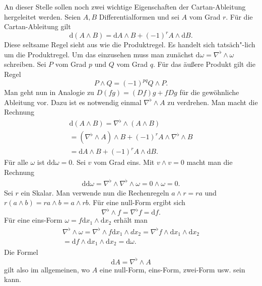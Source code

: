 \documentclass[a4paper,10pt,fleqn,twocolumn,twoside]{article}
\numberwithin{equation}{section}
\begin{document}
An dieser Stelle sollen noch zwei wichtige Eigenschaften der
Cartan-Ableitung hergeleitet werden. Seien $A,B$ Differentialformen
und sei $A$ vom Grad $r$. Für die Cartan-Ableitung gilt
\begin{equation}
\mathrm d(A\wedge B)
= \mathrm dA\wedge B + (-1)^r A\wedge \mathrm dB.
\end{equation}
Diese seltsame Regel sieht aus wie die Produktregel. Es handelt
sich tatsäch"-lich um die Produktregel. Um das einzusehen muss man
zunächst $\mathrm d\omega = \nabla^\flat\wedge\omega$ schreiben.
Sei $P$ vom Grad $p$ und $Q$ vom Grad $q$. Für das
äußere Produkt gilt die Regel
\begin{equation}
P\wedge Q = (-1)^{pq}Q\wedge P.
\end{equation}
Man geht nun in Analogie zu $D(fg)=(Df)g+fDg$ für die gewöhnliche
Ableitung vor. Dazu ist es notwendig einmal $\nabla^\flat\wedge A$
zu verdrehen. Man macht die Rechnung
\begin{gather*}
\mathrm d(A\wedge B) = \nabla^\flat\wedge (A\wedge B)\\
= (\nabla^\flat\wedge A)\wedge B
+ (-1)^r A\wedge\nabla^\flat\wedge B\\
= \mathrm dA\wedge B + (-1)^r A\wedge \mathrm dB.
\end{gather*}
Für alle $\omega$ ist $\mathrm {dd}\omega=0$.
Sei $v$ vom Grad eins.
Mit $v\wedge v=0$ macht man die Rechnung
\begin{gather*}
\mathrm{dd}\omega
= \nabla^\flat\wedge\nabla^\flat\wedge\omega
= 0\wedge\omega = 0.
\end{gather*}
Sei $r$ ein Skalar. Man verwende nun die Rechenregeln $a\wedge r=ra$ und
$r(a\wedge b) = ra\wedge b = a\wedge rb$. Für eine null-Form ergibt sich
\begin{equation}
\nabla^\flat\wedge f = \nabla^\flat f = \mathrm df.
\end{equation}
Für eine eins-Form $\omega = f\mathrm dx_1\wedge\mathrm dx_2$
erhält man
\begin{gather*}
\nabla^\flat\wedge\omega = \nabla^\flat\wedge f\mathrm dx_1\wedge dx_2
= \nabla^\flat f\wedge\mathrm dx_1\wedge\mathrm dx_2\\
= \mathrm df\wedge\mathrm dx_1\wedge\mathrm dx_2
= \mathrm d\omega.
\end{gather*}
Die Formel
\begin{equation}
\mathrm dA = \nabla^\flat\wedge A
\end{equation}
gilt also im allgemeinen, wo $A$ eine null-Form, eins-Form,
zwei-Form usw. sein kann.
\end{document}
